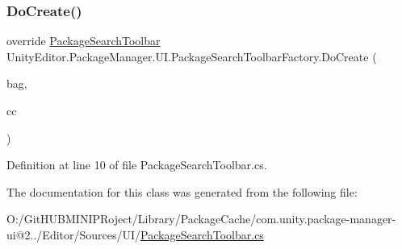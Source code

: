 \subsubsection{\texorpdfstring{DoCreate()}{DoCreate()}}
{\footnotesize\ttfamily override \mbox{\hyperlink{class_unity_editor_1_1_package_manager_1_1_u_i_1_1_package_search_toolbar}{Package\+Search\+Toolbar}} Unity\+Editor.\+Package\+Manager.\+U\+I.\+Package\+Search\+Toolbar\+Factory.\+Do\+Create (\begin{DoxyParamCaption}\item[{I\+Uxml\+Attributes}]{bag,  }\item[{Creation\+Context}]{cc }\end{DoxyParamCaption})\hspace{0.3cm}{\ttfamily [protected]}}



Definition at line 10 of file Package\+Search\+Toolbar.\+cs.



The documentation for this class was generated from the following file\+:\begin{DoxyCompactItemize}
\item 
O\+:/\+Git\+H\+U\+B\+M\+I\+N\+I\+P\+Roject/\+Library/\+Package\+Cache/com.\+unity.\+package-\/manager-\/ui@2../\+Editor/\+Sources/\+U\+I/\mbox{\hyperlink{_package_search_toolbar_8cs}{Package\+Search\+Toolbar.\+cs}}\end{DoxyCompactItemize}
